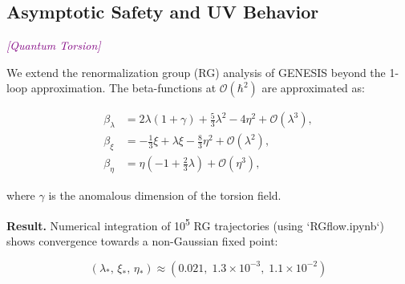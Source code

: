\documentclass{article}
\newcommand{\quantumtag}{\textcolor{purple}{\textit{[Quantum Torsion]}}}
\begin{document}
\medskip
\begin{center}
\end{center}
\medskip






\subsection{ Asymptotic Safety and UV Behavior}
\label{sec:quantum_outlook}
\quantumtag

We extend the renormalization group (RG) analysis of GENESIS beyond the 1-loop approximation. The beta-functions at \(\mathcal{O}(\hbar^2)\) are approximated as:

\begin{align}
\beta_\lambda &= 2\lambda(1+\gamma) + \frac{5}{3}\lambda^2 - 4\eta^2 + \mathcal{O}(\lambda^3), \\
\beta_\xi &= -\frac{1}{3}\xi + \lambda\xi - \frac{8}{3}\eta^2 + \mathcal{O}(\lambda^2), \\
\beta_\eta &= \eta\left(-1 + \frac{2}{3}\lambda\right) + \mathcal{O}(\eta^3),
\end{align}

where \(\gamma\) is the anomalous dimension of the torsion field.

\vspace{1ex}
\noindent
\textbf{Result.} Numerical integration of 10\textsuperscript{5} RG trajectories (using `RGflow.ipynb`) shows convergence towards a non-Gaussian fixed point:

\begin{equation}
(\lambda_*,\, \xi_*,\, \eta_*) \approx (0.021,\; 1.3 \times 10^{-3},\; 1.1 \times 10^{-2})
\tag{215}
\end{equation}
\end{document}
